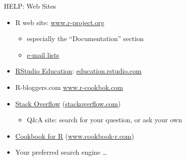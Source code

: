\documentclass[
  11pt,
  ignorenonframetext,
]{beamer}
\providecommand{\tightlist}{%
  \setlength{\itemsep}{0pt}\setlength{\parskip}{0pt}}
\begin{document}
\begin{frame}{HELP: Web Sites}
\protect\hypertarget{help-web-sites}{}
\begin{itemize}
\item
  R web site: \href{http://www.r-project.org}{www.r-project.org}

  \begin{itemize}
  \tightlist
  \item
    especially the ``Documentation'' section
  \item
    \href{https://www.r-project.org/mail.html}{e-mail lists}
  \end{itemize}
\item
  \href{https://education.rstudio.com/}{RStudio Education}:
  \href{https://education.rstudio.com/}{education.rstudio.com}
\item
  R-bloggers.com \href{http://www.r-cookbok.com}{www.r-cookbok.com}
\item
  \href{https://stackoverflow.com/questions/tagged/r}{Stack Overflow}
  (\href{https://stackoverflow.com/questions/tagged/r}{stackoverflow.com})

  \begin{itemize}
  \tightlist
  \item
    Q\&A site: search for your question, or ask your own
  \end{itemize}
\item
  \href{http://www.cookbook-r.com/}{Cookbook for R}
  (\href{http://www.cookbook-r.com/}{www.cookbook-r.com})
\item
  Your preferred search engine \ldots{}
\end{itemize}
\end{frame}
\end{document}
